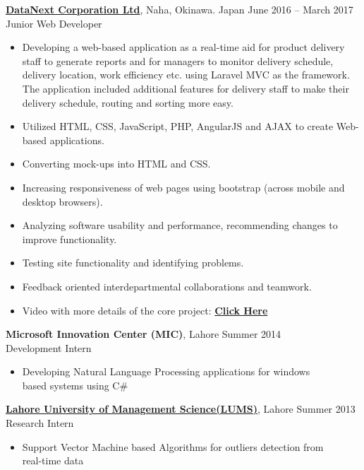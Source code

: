 \documentclass[margin,line]{res}
\begin{document}
\begin{resume}
\href{http://www.datanext.co.jp/en/}{\bf DataNext Corporation Ltd}, Naha, Okinawa. Japan \hfill{June 2016 -- March 2017}\\
Junior Web Developer
\begin{itemize} \itemsep -2pt  %
 \item Developing a web-based application as a real-time aid for product delivery staff to generate reports and for managers to monitor delivery schedule, delivery location, work efficiency etc. using Laravel MVC as the framework.
 The application included additional features for delivery staff to make their delivery schedule, routing and sorting more easy.
 \item Utilized HTML, CSS, JavaScript, PHP, AngularJS and AJAX to create Web-based applications. 
 \item Converting mock-ups into HTML and CSS.
 \item Increasing responsiveness of web pages using bootstrap (across mobile and desktop browsers).
 \item Analyzing software usability and performance, recommending changes to improve functionality.
 \item Testing site functionality and identifying problems.
 \item Feedback oriented interdepartmental collaborations and teamwork.
 \item Video with more details of the core project: \href{http://bit.ly/2sYT9OH}{\bf Click Here}  

 \end{itemize}

{\bf Microsoft Innovation Center (MIC)}, Lahore \hfill 
Summer 2014\\
 Development Intern
\begin{itemize} \itemsep -2pt  %
 \item Developing Natural Language Processing applications for windows\\based systems using C\# 
 \end{itemize}
  \href{https://lums.edu.pk/}{\bf Lahore University of Management Science(LUMS)}, Lahore \hfill Summer 2013
\\Research Intern
\begin{itemize} \itemsep -2pt  %
 \item Support Vector Machine based Algorithms for outliers detection from\\real-time data 
 \end{itemize}



\end{resume}
\end{document}
